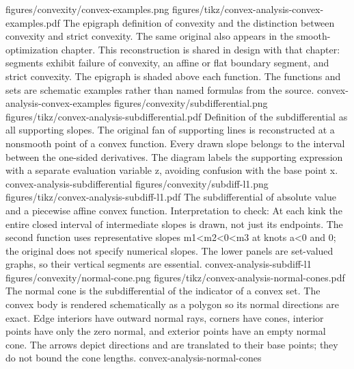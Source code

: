 {figures/convexity/convex-examples.png}
{figures/tikz/convex-analysis-convex-examples.pdf}
{The epigraph definition of convexity and the distinction between convexity and strict convexity.}
{The same original also appears in the smooth-optimization chapter. This reconstruction is shared in design with that chapter: segments exhibit failure of convexity, an affine or flat boundary segment, and strict convexity. The epigraph is shaded above each function. The functions and sets are schematic examples rather than named formulas from the source.}
{convex-analysis-convex-examples}
{figures/convexity/subdifferential.png}
{figures/tikz/convex-analysis-subdifferential.pdf}
{Definition of the subdifferential as all supporting slopes.}
{The original fan of supporting lines is reconstructed at a nonsmooth point of a convex function. Every drawn slope belongs to the interval between the one-sided derivatives. The diagram labels the supporting expression with a separate evaluation variable z, avoiding confusion with the base point x.}
{convex-analysis-subdifferential}
{figures/convexity/subdiff-l1.png}
{figures/tikz/convex-analysis-subdiff-l1.pdf}
{The subdifferential of absolute value and a piecewise affine convex function.}
{Interpretation to check: At each kink the entire closed interval of intermediate slopes is drawn, not just its endpoints. The second function uses representative slopes m1<m2<0<m3 at knots a<0 and 0; the original does not specify numerical slopes. The lower panels are set-valued graphs, so their vertical segments are essential.}
{convex-analysis-subdiff-l1}
{figures/convexity/normal-cone.png}
{figures/tikz/convex-analysis-normal-cones.pdf}
{The normal cone is the subdifferential of the indicator of a convex set.}
{The convex body is rendered schematically as a polygon so its normal directions are exact. Edge interiors have outward normal rays, corners have cones, interior points have only the zero normal, and exterior points have an empty normal cone. The arrows depict directions and are translated to their base points; they do not bound the cone lengths.}
{convex-analysis-normal-cones}

